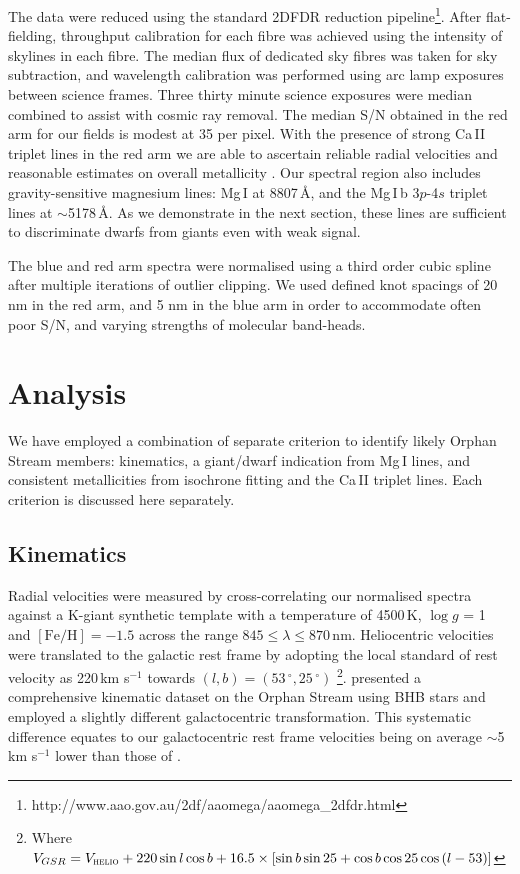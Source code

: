 \documentclass[10pt,apjl]{emulateapj}
\begin{document}
The data were reduced using the standard \textsc{2DFDR} reduction pipeline\footnote{http://www.aao.gov.au/2df/aaomega/aaomega\_2dfdr.html}. After flat-fielding, throughput calibration for each fibre was achieved using the intensity of skylines in each fibre. The median flux of dedicated sky fibres was taken for sky subtraction, and wavelength calibration was performed using arc lamp exposures between science frames. Three thirty minute science exposures were median combined to assist with cosmic ray removal. The median S/N obtained in the red arm for our fields is modest at 35 per pixel. With the presence of strong Ca\,\textsc{II} triplet lines in the red arm we are able to ascertain reliable radial velocities and reasonable estimates on overall metallicity \citep[][and references therein]{Starkenburg_et-al_2010}. Our spectral region also includes gravity-sensitive magnesium lines: Mg\,\textsc{I} at 8807\,{\AA}, and the Mg\,\textsc{I}\,b 3$p$-4$s$ triplet lines at $\sim$5178\,{\AA}. As we demonstrate in the next section, these lines are sufficient to discriminate dwarfs from giants even with weak signal.

The blue and red arm spectra were normalised using a third order cubic spline after multiple iterations of outlier clipping. We used defined knot spacings of 20 nm in the red arm, and 5 nm in the blue arm in order to accommodate often poor S/N, and varying strengths of molecular band-heads.

\section{Analysis}
\label{sec:analysis}

We have employed a combination of separate criterion to identify likely Orphan Stream members: kinematics, a giant/dwarf indication from Mg\,\textsc{I} lines, and consistent metallicities from isochrone fitting and the Ca\,\textsc{II} triplet lines. Each criterion is discussed here separately.

\subsection{Kinematics}
Radial velocities were measured by cross-correlating our normalised spectra against a K-giant synthetic template with a temperature of 4500\,K, $\log{g}$ = 1 and $[\mbox{Fe/H}] = -1.5$ across the range $845 \leq \lambda \leq 870$\,nm. Heliocentric velocities were translated to the galactic rest frame by adopting the local standard of rest velocity as 220\,km s$^{-1}$ towards $(l, b) = (53\,^\circ, 25\,^\circ)$ \citep{Kerr_Lynden-Bell_1986, Mihalas_Binney_1981}\footnote{Where $V_{GSR} = V_{\textsc{helio}} + 220\sin{l}\cos{b} + 16.5\times[\sin{b}\sin{25} + \cos{b}\cos{25}\cos{(l - 53)}]$}. \citet{Newberg_et-al_2010} presented a comprehensive kinematic dataset on the Orphan Stream using BHB stars and employed a slightly different galactocentric transformation. This systematic difference equates to our galactocentric rest frame velocities being on average $\sim$5\,km s$^{-1}$ lower than those of \citet{Newberg_et-al_2010}.
\end{document}
